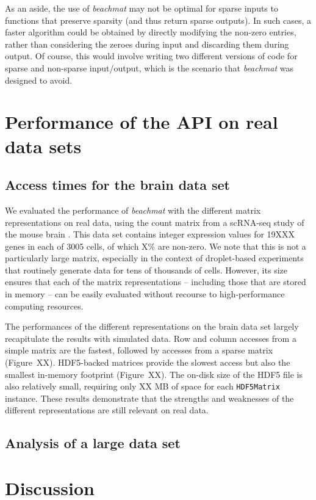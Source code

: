 \documentclass[10pt,letterpaper]{article}
\newcommand{\beachmat}{\textit{beachmat}}
\newcommand{\code}[1]{\texttt{#1}}
\begin{document}
As an aside, the use of \beachmat{} may not be optimal for sparse inputs to functions that preserve sparsity (and thus return sparse outputs).
In such cases, a faster algorithm could be obtained by directly modifying the non-zero entries, rather than considering the zeroes during input and discarding them during output.
Of course, this would involve writing two different versions of code for sparse and non-sparse input/output, which is the scenario that \beachmat{} was designed to avoid.

\section*{Performance of the API on real data sets}

\subsection*{Access times for the brain data set}
We evaluated the performance of \beachmat{} with the different matrix representations on real data, using the count matrix from a scRNA-seq study of the mouse brain \cite{zeisel2015brain}.
This data set contains integer expression values for 19XXX genes in each of 3005 cells, of which X\% are non-zero.
We note that this is not a particularly large matrix, especially in the context of droplet-based experiments that routinely generate data for tens of thousands of cells.
However, its size ensures that each of the matrix representations -- including those that are stored in memory -- can be easily evaluated without recourse to high-performance computing resources.

The performances of the different representations on the brain data set largely recapitulate the results with simulated data.
Row and column accesses from a simple matrix are the fastest, followed by accesses from a sparse matrix (Figure~XX).
HDF5-backed matrices provide the slowest access but also the smallest in-memory footprint (Figure~XX).
The on-disk size of the HDF5 file is also relatively small, requiring only XX MB of space for each \code{HDF5Matrix} instance. 
These results demonstrate that the strengths and weaknesses of the different representations are still relevant on real data.

\subsection*{Analysis of a large data set}

\section*{Discussion}
\end{document}
